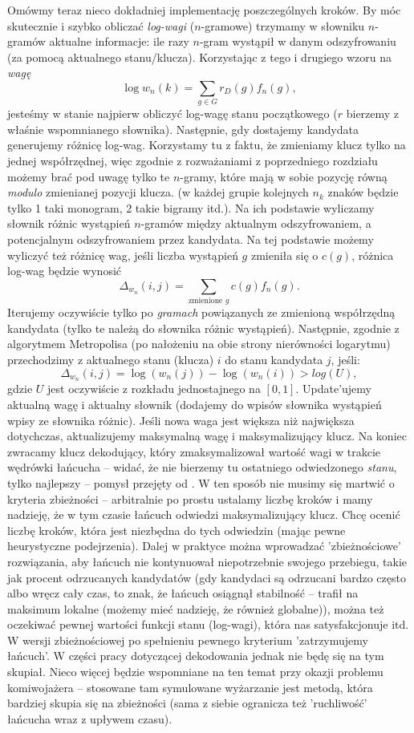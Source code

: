 \documentclass[a4paper]{article}
\theoremstyle{defn}
\theoremstyle{theorem}
\theoremstyle{lemma}
\theoremstyle{cor}
\theoremstyle{fact}
\begin{document}
Omówmy teraz nieco dokładniej implementację poszczególnych kroków. By móc skutecznie i szybko obliczać \textit{log-wagi} ($n$-gramowe) trzymamy w słowniku $n$-gramów aktualne informacje: ile razy $n$-gram wystąpił w danym odszyfrowaniu (za pomocą aktualnego stanu/klucza). Korzystając z tego i drugiego wzoru na \textit{wagę}
$$\log w_n(k) =\sum\limits_{g \in G}  {r_D(g)} f_n(g),$$
jesteśmy w stanie najpierw obliczyć log-wagę stanu początkowego ($r$ bierzemy z właśnie wspomnianego słownika). Następnie, gdy dostajemy kandydata generujemy różnicę log-wag. Korzystamy tu z faktu, że zmieniamy klucz tylko na jednej współrzędnej, więc zgodnie z rozważaniami z poprzedniego rozdziału możemy brać pod uwagę tylko te $n$-gramy, które mają w sobie pozycję równą \textit{modulo} zmienianej pozycji klucza. (w każdej grupie kolejnych $n_k$ znaków będzie tylko 1 taki monogram, 2 takie bigramy itd.). Na ich podstawie wyliczamy słownik różnic wystąpień $n$-gramów między aktualnym odszyfrowaniem, a potencjalnym odszyfrowaniem przez kandydata. Na tej podstawie możemy wyliczyć też różnicę wag, jeśli liczba wystąpień $g$ zmieniła się o $c(g)$, różnica log-wag będzie wynosić
$$\Delta_{w_n}(i,j) = \sum\limits_{\text{zmienione } g}  {c(g)} f_n(g).$$
Iterujemy oczywiście tylko po \textit{gramach} powiązanych ze zmienioną współrzędną kandydata (tylko te należą do słownika różnic wystąpień). Następnie, zgodnie z algorytmem Metropolisa (po nałożeniu na obie strony nierówności logarytmu) przechodzimy z aktualnego stanu (klucza) $i$ do stanu kandydata $j$, jeśli:
$$\Delta_{w_n}(i,j) =\log(w_n(j)) - \log(w_n(i)) > log(U),$$ gdzie $U$ jest oczywiście z rozkładu jednostajnego na $[0,1]$. Update'ujemy aktualną wagę i aktualny słownik (dodajemy do wpisów słownika wystąpień wpisy ze słownika różnic). Jeśli nowa waga jest większa niż największa dotychczas, aktualizujemy maksymalną wagę i maksymalizujący klucz. Na koniec zwracamy klucz dekodujący, który zmaksymalizował wartość wagi w trakcie wędrówki łańcucha – widać, że nie bierzemy tu ostatniego odwiedzonego \textit{stanu}, tylko najlepszy – pomysł przejęty od \cite{Chen&Rosenthal}. W ten sposób nie musimy się martwić o kryteria zbieżności – arbitralnie po prostu ustalamy liczbę kroków i mamy nadzieję, że w tym czasie łańcuch odwiedzi maksymalizujący klucz. Chcę ocenić liczbę kroków, która jest niezbędna do tych odwiedzin (mając pewne heurystyczne podejrzenia). Dalej w praktyce można wprowadzać 'zbieżnościowe' rozwiązania, aby łańcuch nie kontynuował niepotrzebnie swojego przebiegu, takie jak procent odrzucanych kandydatów (gdy kandydaci są odrzucani bardzo często albo wręcz cały czas, to znak, że łańcuch osiągnął stabilność – trafił na maksimum lokalne (możemy mieć nadzieję, że również globalne)), można też oczekiwać pewnej wartości funkcji stanu (log-wagi), która nas satysfakcjonuje itd. W wersji zbieżnościowej po spełnieniu pewnego kryterium 'zatrzymujemy łańcuch'. W części pracy dotyczącej dekodowania jednak nie będę się na tym skupiał. Nieco więcej będzie wspomniane na ten temat przy okazji problemu komiwojażera – stosowane tam symulowane wyżarzanie jest metodą, która bardziej skupia się na zbieżności (sama z siebie ogranicza też 'ruchliwość' łańcucha wraz z upływem czasu).
\\
\end{document}
